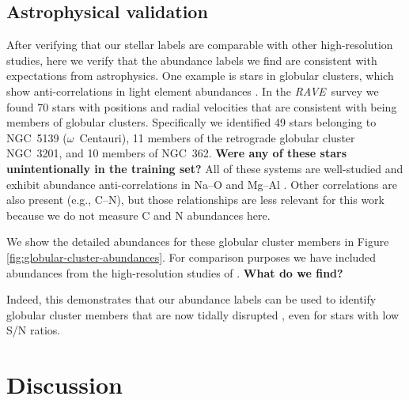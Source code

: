 \documentclass[preprint,trackchanges]{aastex}
\newcommand{\project}[1]{\textsl{#1}}
\newcommand{\acronym}[1]{{\small{#1}}}
\newcommand{\rave}{\project{\acronym{RAVE}}}
\newcommand{\stub}[1]{\textbf{#1}}
\begin{document}
\subsection{Astrophysical validation}

After verifying that our stellar labels are comparable with other
high-resolution studies, here we verify that the abundance labels we find
are consistent with expectations from astrophysics.  One example is stars in
globular clusters, which show anti-correlations in light element abundances 
\citep[e.g.,][and references therein]{Da_Costa,Carretta_2009}.  In the \rave\
survey we found 70 stars with positions and radial velocities that are
consistent with being members of globular clusters.  Specifically we identified
49 stars belonging to NGC~5139 ($\omega$~Centauri), 11 members of the retrograde
globular cluster NGC~3201, and 10 members of NGC~362.  
\stub{Were any of these stars unintentionally in the training set?}
All of these systems are well-studied and exhibit abundance anti-correlations 
in Na--O and Mg--Al \citep{people}.  Other correlations are also present 
(e.g., C--N), but those relationships are less relevant for this work because 
we do not measure C and N abundances here.


We show the detailed abundances for these globular cluster members in
Figure \ref{fig:globular-cluster-abundances}.  For comparison purposes we
have included abundances from the high-resolution studies of \citep{people}.
\stub{What do we find?}

Indeed, this demonstrates that our abundance labels can be used to identify
globular cluster members that are now tidally disrupted \citep{Anguiano_2016,Kuzma_2016,Navin_2016},
even for stars with low S/N ratios.






\section{Discussion}
\label{sec:discussion}
\end{document}
